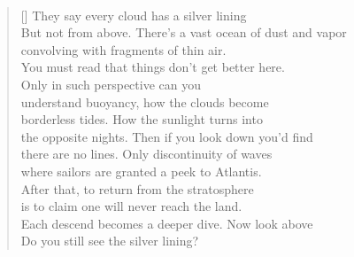 \documentclass{book}
\begin{document}
\poemtitle{\textcolor[RGB]{175,25,25}{Silver lining}}
\hspace*{\fill} \\
\settowidth{\versewidth}{But not from above. There's a vast ocean of dust and vapor}
\begin{verse}[\versewidth]
    They say every cloud has a silver lining\\
    But not from above. There's a vast ocean of dust and vapor\\
    convolving with fragments of thin air.\\
    You must read that things don't get better here.\\
    Only in such perspective can you\\
    understand buoyancy, how the clouds become\\
    borderless tides. How the sunlight turns into\\
    the opposite nights. Then if you look down you'd find\\
    there are no lines. Only discontinuity of waves\\
    where sailors are granted a peek to Atlantis.\\
    After that, to return from the stratosphere\\
    is to claim one will never reach the land. \\
    Each descend becomes a deeper dive. Now look above\\
    Do you still see the silver lining?\\
\end{verse}
\end{document}
